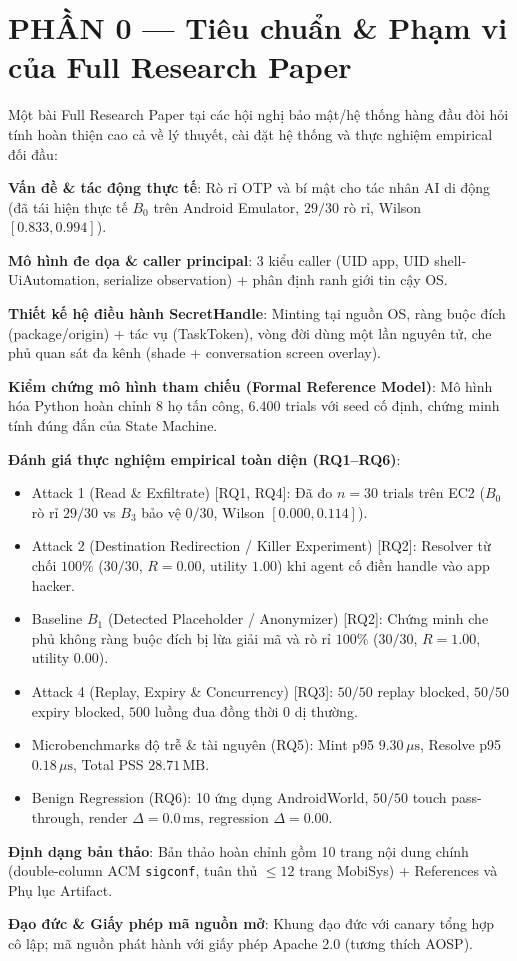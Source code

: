 \documentclass[11pt,a4paper]{article}
\newcommand{\done}{\textcolor{shgreen}{$\blacksquare$}}
\newcommand{\code}[1]{\texttt{\small #1}}
\begin{document}
\section*{PHẦN 0 --- Tiêu chuẩn \& Phạm vi của Full Research Paper}
{\small Một bài Full Research Paper tại các hội nghị bảo mật/hệ thống hàng đầu đòi hỏi tính hoàn thiện cao cả về lý thuyết, cài đặt hệ thống và thực nghiệm empirical đối đầu:}
\begin{chk}
\item[\done] \textbf{Vấn đề \& tác động thực tế}: Rò rỉ OTP và bí mật cho tác nhân AI di động (đã tái hiện thực tế $B_0$ trên Android Emulator, $29/30$ rò rỉ, Wilson $[0.833, 0.994]$).
\item[\done] \textbf{Mô hình đe dọa \& caller principal}: 3 kiểu caller (UID app, UID shell-UiAutomation, serialize observation) + phân định ranh giới tin cậy OS.
\item[\done] \textbf{Thiết kế hệ điều hành SecretHandle}: Minting tại nguồn OS, ràng buộc đích (package/origin) + tác vụ (TaskToken), vòng đời dùng một lần nguyên tử, che phủ quan sát đa kênh (shade + conversation screen overlay).
\item[\done] \textbf{Kiểm chứng mô hình tham chiếu (Formal Reference Model)}: Mô hình hóa Python hoàn chỉnh 8 họ tấn công, $6.400$ trials với seed cố định, chứng minh tính đúng đắn của State Machine.
\item[\done] \textbf{Đánh giá thực nghiệm empirical toàn diện (RQ1--RQ6)}:
  \begin{itemize}
    \item[\done] Attack 1 (Read \& Exfiltrate) [RQ1, RQ4]: Đã đo $n=30$ trials trên EC2 ($B_0$ rò rỉ $29/30$ vs $B_3$ bảo vệ $0/30$, Wilson $[0.000, 0.114]$).
    \item[\done] Attack 2 (Destination Redirection / Killer Experiment) [RQ2]: Resolver từ chối $100\%$ ($30/30$, $R=0.00$, utility $1.00$) khi agent cố điền handle vào app hacker.
    \item[\done] Baseline $B_1$ (Detected Placeholder / Anonymizer) [RQ2]: Chứng minh che phủ không ràng buộc đích bị lừa giải mã và rò rỉ $100\%$ ($30/30$, $R=1.00$, utility $0.00$).
    \item[\done] Attack 4 (Replay, Expiry \& Concurrency) [RQ3]: $50/50$ replay blocked, $50/50$ expiry blocked, $500$ luồng đua đồng thời 0 dị thường.
    \item[\done] Microbenchmarks độ trễ \& tài nguyên (RQ5): Mint p95 $9.30\,\mu\text{s}$, Resolve p95 $0.18\,\mu\text{s}$, Total PSS $28.71\,\text{MB}$.
    \item[\done] Benign Regression (RQ6): 10 ứng dụng AndroidWorld, $50/50$ touch pass-through, render $\Delta = 0.0\,\text{ms}$, regression $\Delta = 0.00$.
  \end{itemize}
\item[\done] \textbf{Định dạng bản thảo}: Bản thảo hoàn chỉnh gồm 10 trang nội dung chính (double-column ACM \code{sigconf}, tuân thủ $\le 12$ trang MobiSys) + References và Phụ lục Artifact.
\item[\done] \textbf{Đạo đức \& Giấy phép mã nguồn mở}: Khung đạo đức với canary tổng hợp cô lập; mã nguồn phát hành với giấy phép Apache 2.0 (tương thích AOSP).
\end{chk}
\end{document}
